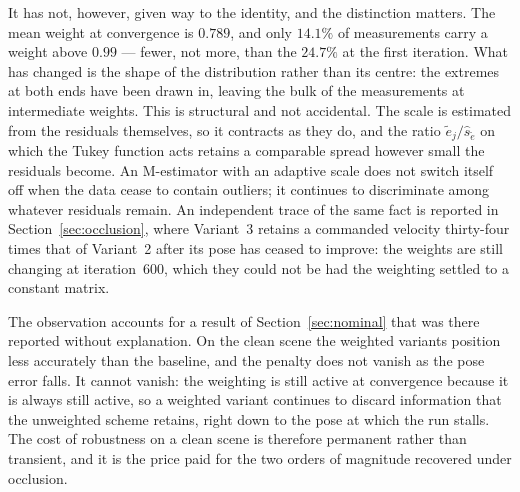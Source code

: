 It has not, however, given way to the identity, and the distinction matters.
The mean weight at convergence is $0.789$, and only $14.1\%$ of measurements
carry a weight above $0.99$ --- fewer, not more, than the $24.7\%$ at the
first iteration. What has changed is the shape of the distribution rather
than its centre: the extremes at both ends have been drawn in, leaving the
bulk of the measurements at intermediate weights. This is structural and not
accidental. The scale is estimated from the residuals themselves, so it
contracts as they do, and the ratio $\tilde{e}_{j}/\hat{s}_{\tilde{e}}$ on
which the Tukey function acts retains a comparable spread however small the
residuals become. An M-estimator with an adaptive scale does not switch itself
off when the data cease to contain outliers; it continues to discriminate
among whatever residuals remain. An independent trace of the same fact is
reported in Section~\ref{sec:occlusion}, where Variant~3 retains a commanded
velocity thirty-four times that of Variant~2 after its pose has ceased to
improve: the weights are still changing at iteration~$600$, which they could
not be had the weighting settled to a constant matrix.

The observation accounts for a result of Section~\ref{sec:nominal} that was
there reported without explanation. On the clean scene the weighted variants
position less accurately than the baseline, and the penalty does not vanish as
the pose error falls. It cannot vanish: the weighting is still active at
convergence because it is always still active, so a weighted variant continues
to discard information that the unweighted scheme retains, right down to the
pose at which the run stalls. The cost of robustness on a clean scene is
therefore permanent rather than transient, and it is the price paid for the
two orders of magnitude recovered under occlusion.

